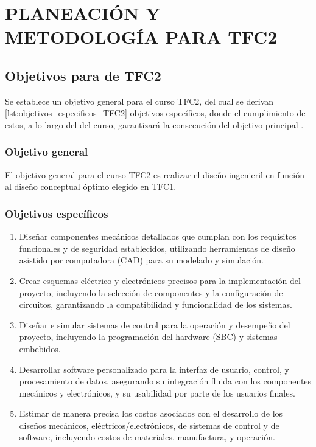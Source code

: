 \chapter*{\MakeUppercase{Planeación y Metodología para TFC2}}
\thispagestyle{mainmatterstyle} %

\section*{Objetivos para de TFC2}
Se establece un objetivo general para el curso TFC2, del cual se derivan \ref{lst:objetivos_especificos_TFC2} objetivos específicos, donde el cumplimiento de estos, a lo largo del del curso, garantizará la consecución del objetivo principal .

\subsection*{Objetivo general}

El objetivo general para el curso TFC2 es realizar el diseño ingenieril en función al diseño conceptual óptimo elegido en TFC1.

\subsection*{Objetivos específicos}

\begin{enumerate}
	\setlength\itemsep{-0.5em}
	\item Diseñar componentes mecánicos detallados que cumplan con los requisitos funcionales y de seguridad establecidos, utilizando herramientas de diseño asistido por computadora (CAD) para su modelado y simulación.
	\item Crear esquemas eléctrico y electrónicos precisos para la implementación del proyecto, incluyendo la selección de componentes y la configuración de circuitos, garantizando la compatibilidad y funcionalidad de los sistemas.
	\item Diseñar e simular sistemas de control para la operación y desempeño del proyecto, incluyendo la programación del hardware (SBC) y sistemas embebidos.
	\item Desarrollar software personalizado para la interfaz de usuario, control, y procesamiento de datos, asegurando su integración fluida con los componentes mecánicos y electrónicos, y su usabilidad por parte de los usuarios finales.
	\item Estimar de manera precisa los costos asociados con el desarrollo de los diseños mecánicos, eléctricos/electrónicos, de sistemas de control y de software, incluyendo costos de materiales, manufactura, y operación.
	\label{lst:objetivos_especificos_TFC2}
\end{enumerate}

